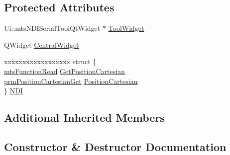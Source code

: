 \subsection*{Protected Attributes}
\begin{DoxyCompactItemize}
\item 
Ui\+::mts\+N\+D\+I\+Serial\+Tool\+Qt\+Widget $\ast$ \hyperlink{classmts_n_d_i_serial_tool_qt_component_af967ad37bf503470a35cb6fd9b6bd247}{Tool\+Widget}
\item 
Q\+Widget \hyperlink{classmts_n_d_i_serial_tool_qt_component_ae0c40b10c41b0859fd974923538e77aa}{Central\+Widget}
\item 
\begin{tabbing}
xx\=xx\=xx\=xx\=xx\=xx\=xx\=xx\=xx\=\kill
struct \{\\
\>\hyperlink{classmts_function_read}{mtsFunctionRead} \hyperlink{classmts_n_d_i_serial_tool_qt_component_a71bcb12553a365aadbb331892c63c734}{GetPositionCartesian}\\
\>\hyperlink{classprm_position_cartesian_get}{prmPositionCartesianGet} \hyperlink{classmts_n_d_i_serial_tool_qt_component_aeeeb01caede4ad7c1b9861e6b5325941}{PositionCartesian}\\
\} \hyperlink{classmts_n_d_i_serial_tool_qt_component_a5373227414bb34244a6bf26aa8405e21}{NDI}\\

\end{tabbing}\end{DoxyCompactItemize}
\subsection*{Additional Inherited Members}


\subsection{Constructor \& Destructor Documentation}
\hypertarget{classmts_n_d_i_serial_tool_qt_component_a936a395717f665487020236f9937fe89}{}
